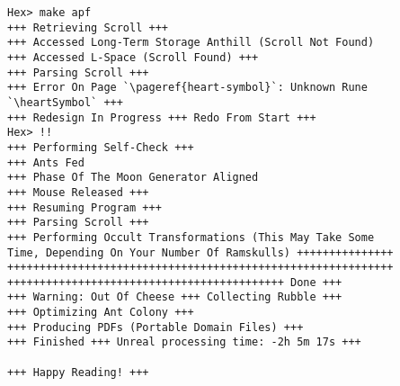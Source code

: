 \documentclass[\baseFontSize,twoside]{memoir}
\newcommand{\heartSymbol}{$\heartsuit$}
\begin{document}
\begin{lrbox}{\preambleBox}%
\begin{lstlisting}
Hex> make apf
+++ Retrieving Scroll +++
+++ Accessed Long-Term Storage Anthill (Scroll Not Found)
+++ Accessed L-Space (Scroll Found) +++
+++ Parsing Scroll +++
+++ Error On Page `\pageref{heart-symbol}`: Unknown Rune `\heartSymbol` +++
+++ Redesign In Progress +++ Redo From Start +++
Hex> !!
+++ Performing Self-Check +++
+++ Ants Fed
+++ Phase Of The Moon Generator Aligned
+++ Mouse Released +++
+++ Resuming Program +++
+++ Parsing Scroll +++
+++ Performing Occult Transformations (This May Take Some
Time, Depending On Your Number Of Ramskulls) +++++++++++++++
++++++++++++++++++++++++++++++++++++++++++++++++++++++++++++
+++++++++++++++++++++++++++++++++++++++++++ Done +++
+++ Warning: Out Of Cheese +++ Collecting Rubble +++
+++ Optimizing Ant Colony +++
+++ Producing PDFs (Portable Domain Files) +++
+++ Finished +++ Unreal processing time: -2h 5m 17s +++

+++ Happy Reading! +++
\end{lstlisting}
\end{lrbox}


\end{document}
